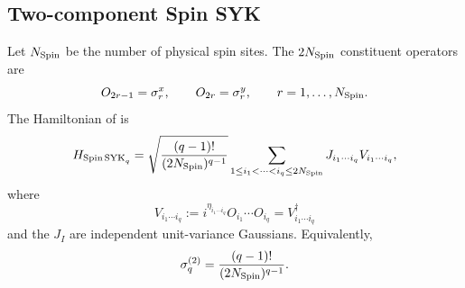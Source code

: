\documentclass{article}
\theoremstyle{definition}
\begin{document}
\subsection{Two-component Spin SYK}

Let $N_{\rm Spin}$ be the number of physical spin sites.  The
$2N_{\rm Spin}$ constituent operators are
\begin{equation}
    O_{2r-1}=\sigma_r^x,
    \qquad
    O_{2r}=\sigma_r^y,
    \qquad
    r=1,\ldots,N_{\rm Spin}.
\end{equation}
The Hamiltonian of \cite{xu2025dynamics} is
\begin{equation}
    H_{{\rm Spin\,SYK}_q}
    =\sqrt{\frac{(q-1)!}{(2N_{\rm Spin})^{q-1}}}
    \sum_{1\le i_1<\cdots<i_q\le2N_{\rm Spin}}
    J_{i_1\cdots i_q}V_{i_1\cdots i_q},
\end{equation}
where
\begin{equation}
    V_{i_1\cdots i_q}
    :=i^{\eta_{i_1\cdots i_q}}O_{i_1}\cdots O_{i_q}
    =V_{i_1\cdots i_q}^\dagger
\end{equation}
and the $J_I$ are independent unit-variance Gaussians.  Equivalently,
\begin{equation}
    \sigma_q^{(2)}
    =\frac{(q-1)!}{(2N_{\rm Spin})^{q-1}}.
\end{equation}
\end{document}
